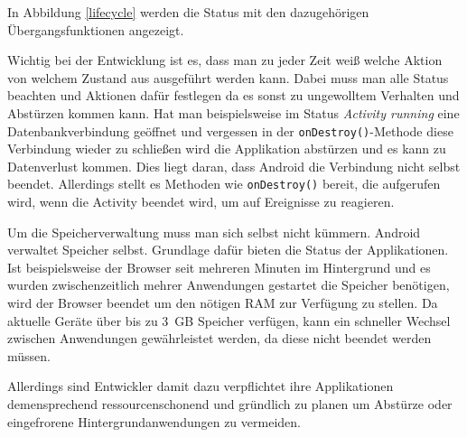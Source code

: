 In Abbildung \ref{lifecycle} werden die Status mit den dazugehörigen Übergangsfunktionen angezeigt.

Wichtig bei der Entwicklung ist es, dass man zu jeder Zeit weiß welche Aktion von welchem Zustand aus ausgeführt werden kann. Dabei muss man alle Status beachten und Aktionen dafür festlegen da es sonst zu ungewolltem Verhalten und Abstürzen kommen kann. Hat man beispielsweise im Status \emph{Activity running} eine Datenbankverbindung geöffnet und vergessen in der \verb+onDestroy()+-Methode diese Verbindung wieder zu schließen wird die Applikation abstürzen und es kann zu Datenverlust kommen. Dies liegt daran, dass Android die Verbindung nicht selbst beendet. Allerdings stellt es Methoden wie \verb+onDestroy()+ bereit, die aufgerufen wird, wenn die Activity beendet wird, um auf Ereignisse zu reagieren.

Um die Speicherverwaltung muss man sich selbst nicht kümmern. Android verwaltet Speicher selbst. Grundlage dafür bieten die Status der Applikationen. Ist beispielsweise der Browser seit mehreren Minuten im Hintergrund und es wurden zwischenzeitlich mehrer Anwendungen gestartet die Speicher benötigen, wird der Browser beendet um den nötigen RAM zur Verfügung zu stellen. Da aktuelle Geräte über bis zu \SI{3}{GB} Speicher verfügen, kann ein schneller Wechsel zwischen Anwendungen gewährleistet werden, da diese nicht beendet werden müssen.

Allerdings sind Entwickler damit dazu verpflichtet ihre Applikationen demensprechend ressourcenschonend und gründlich zu planen um Abstürze oder eingefrorene Hintergrundanwendungen zu vermeiden.